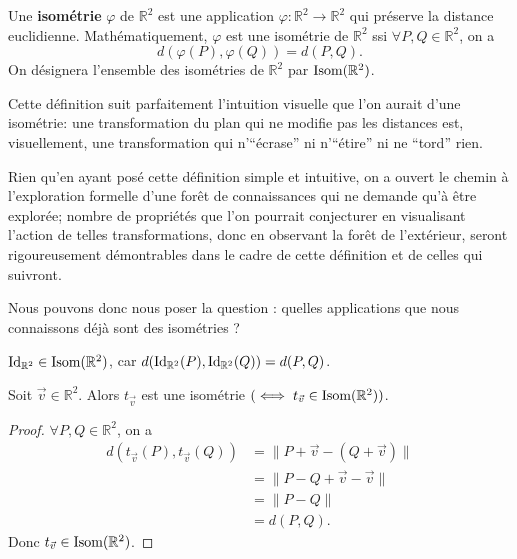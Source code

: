 \documentclass{book}
\numberwithin{equation}{section}
\renewcommand{\phi}{\varphi}
\providecommand{\plan}{{\mathbb R^2}}
\providecommand{\id}{{\textnormal{Id}}}
\providecommand{\idR}{{\id_\plan}}
\providecommand{\isom}{{\textnormal{Isom}(\plan)}}
\providecommand{\trans}[1]{{t_{#1}}}
\providecommand{\longueur}[1]{{\lVert#1\rVert}}
\begin{document}
\begin{defn}
	Une \textbf{isométrie} $\phi$ de $\plan$ est une application $\phi : \plan \to \plan$ qui préserve la distance euclidienne. Mathématiquement, $\phi$ est une isométrie de $\plan$ ssi $\forall P, Q \in \plan$, on a 
	\begin{equation}
		d(\phi(P), \phi(Q)) = d(P, Q).
	\end{equation}
	On désignera l'ensemble des isométries de $\plan$ par $\isom$.
\end{defn}

Cette définition suit parfaitement l'intuition visuelle que l'on aurait d'une isométrie: une transformation du plan qui ne modifie pas les distances est, visuellement, une transformation qui n'``écrase'' ni n'``étire'' ni ne ``tord'' rien.\par
Rien qu'en ayant posé cette définition simple et intuitive, on a ouvert le chemin à l'exploration formelle d'une forêt de connaissances qui ne demande qu'à être explorée; nombre de propriétés que l'on pourrait conjecturer en visualisant l'action de telles transformations, donc en observant la forêt de l'extérieur, seront rigoureusement démontrables dans le cadre de cette définition et de celles qui suivront.\par
Nous pouvons donc nous poser la question : quelles applications que nous connaissons déjà sont des isométries ?

\begin{exmp}
	$\idR \in \isom$, car $d(\idR(P), \idR(Q)) = d(P, Q)$.
\end{exmp}

\begin{prop}
	Soit $\vec v \in \plan$. Alors $\trans{\vec v}$ est une isométrie $( \iff \trans{\vec v} \in \isom)$.
\end{prop}
\begin{proof}
	$\forall P, Q \in \plan$, on a
	\begin{align*}
		d(\trans{\vec v}(P), \trans{\vec v}(Q)) &= \longueur{P + \vec v - (Q + \vec v)}\\
		&= \longueur{P - Q + \vec v - \vec v}\\
		&= \longueur{P - Q}\\
		&= d(P, Q).
	\end{align*}
	Donc $\trans{\vec v} \in \isom$.
\end{proof}
\end{document}
